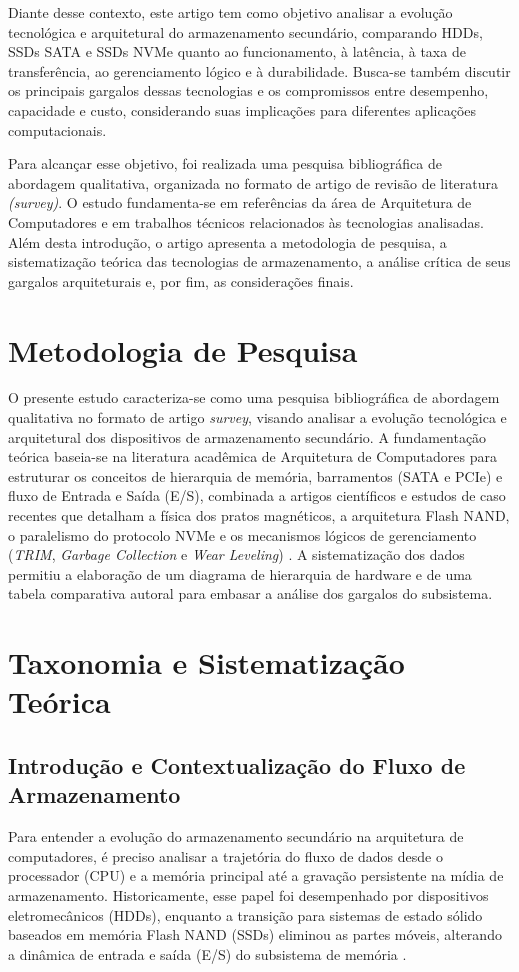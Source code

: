 \documentclass[12pt]{article}
\begin{document}
Diante desse contexto, este artigo tem como objetivo analisar a evolução tecnológica e arquitetural do armazenamento secundário, comparando HDDs, SSDs SATA e SSDs NVMe quanto ao funcionamento, à latência, à taxa de transferência, ao gerenciamento lógico e à durabilidade. Busca-se também discutir os principais gargalos dessas tecnologias e os compromissos entre desempenho, capacidade e custo, considerando suas implicações para diferentes aplicações computacionais.

Para alcançar esse objetivo, foi realizada uma pesquisa bibliográfica de abordagem qualitativa, organizada no formato de artigo de revisão de literatura \textit{(survey)}. O estudo fundamenta-se em referências da área de Arquitetura de Computadores e em trabalhos técnicos relacionados às tecnologias analisadas. Além desta introdução, o artigo apresenta a metodologia de pesquisa, a sistematização teórica das tecnologias de armazenamento, a análise crítica de seus gargalos arquiteturais e, por fim, as considerações finais.

\section{Metodologia de Pesquisa}
O presente estudo caracteriza-se como uma pesquisa bibliográfica de abordagem qualitativa no formato de artigo \textit{survey}, visando analisar a evolução tecnológica e arquitetural dos dispositivos de armazenamento secundário. A fundamentação teórica baseia-se na literatura acadêmica de Arquitetura de Computadores \cite{stallings2017} para estruturar os conceitos de hierarquia de memória, barramentos (SATA e PCIe) e fluxo de Entrada e Saída (E/S), combinada a artigos científicos e estudos de caso recentes que detalham a física dos pratos magnéticos, a arquitetura Flash NAND, o paralelismo do protocolo NVMe e os mecanismos lógicos de gerenciamento (\textit{TRIM}, \textit{Garbage Collection} e \textit{Wear Leveling}) \cite{santos2014, ribeiro2017, george2023, xu2015}. A sistematização dos dados permitiu a elaboração de um diagrama de hierarquia de hardware e de uma tabela comparativa autoral para embasar a análise dos gargalos do subsistema.

\section{Taxonomia e Sistematização Teórica} 

\subsection{Introdução e Contextualização do Fluxo de Armazenamento} 
Para entender a evolução do armazenamento secundário na arquitetura de computadores, é preciso analisar a trajetória do fluxo de dados desde o processador (CPU) e a memória principal até a gravação persistente na mídia de armazenamento. Historicamente, esse papel foi desempenhado por dispositivos eletromecânicos (HDDs), enquanto a transição para sistemas de estado sólido baseados em memória Flash NAND (SSDs) eliminou as partes móveis, alterando a dinâmica de entrada e saída (E/S) do subsistema de memória \cite{santos2014, stallings2017}. 
\end{document}
